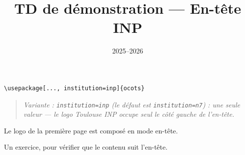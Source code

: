 \documentclass[11pt]{ocots-td}
\title{TD de démonstration — En-tête INP}
\date{2025--2026}
\newcommand{\ocotsvariantnote}[1]{\begin{quote}\itshape Variante : #1\end{quote}}
\begin{document}
\maketitle

\begin{lstlisting}
\usepackage[..., institution=inp]{ocots}
\end{lstlisting}
\ocotsvariantnote{\texttt{institution=inp} (le défaut est
\texttt{institution=n7}) : une seule valeur — le logo Toulouse INP occupe
seul le côté gauche de l'en-tête.}

\begin{instructions}
    Le logo de la première page est composé en mode en-tête.
\end{instructions}

\begin{exercise}[points=2]
    Un exercice, pour vérifier que le contenu suit l'en-tête.
\end{exercise}
\end{document}
